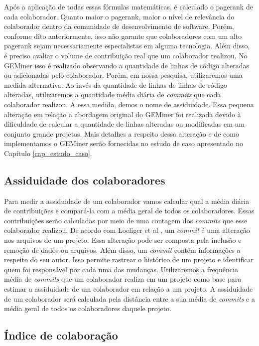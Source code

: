 Após a aplicação de todas essas fórmulas matemáticas, é calculado o pagerank de cada colaborador. Quanto maior o pagerank, maior o nível de relevância do colaborador dentro da comunidade de desenvolvimento de software. Porém, conforme dito anteriormente, isso não garante que colaboradores com um alto pagerank sejam necessariamente especialistas em alguma tecnologia. Além disso, é preciso avaliar o volume de contribuição real que um colaborador realizou. No GEMiner isso é realizado observando a quantidade de linhas de código alteradas ou adicionadas pelo colaborador. Porém, em nossa pesquisa, utilizaremos uma medida alternativa. Ao invés da quantidade de linhas de linhas de código alteradas, utilizaremos a quantidade média diária de \textit{commits} que cada colaborador realizou. A essa medida, demos o nome de assiduidade. Essa pequena alteração em relação a abordagem original do GEMiner foi realizada devido à dificuldade de calcular a quantidade de linhas alteradas ou modificadas em um conjunto grande projetos. Mais detalhes a respeito dessa alteração e de como implementamos o GEMiner serão fornecidas no estudo de caso apresentado no Capítulo \ref{cap_estudo_caso}.

\subsection{Assiduidade dos colaboradores}

Para medir a assiduidade de um colaborador vamos calcular qual a média diária de contribuições e compará-la com a média geral de todos os colaboradores. Essas contribuições serão calculadas por meio de uma contagem dos \textit{commits} que esse colaborador realizou.  De acordo com Loeliger et al \cite{loeliger2012version}, um \textit{commit} é uma alteração nos arquivos de um projeto. Essa alteração pode ser composta pela inclusão e remoção de dados ou arquivos. Além disso, um \textit{commit} contém informações a respeito do seu autor. Isso permite rastrear o histórico de um projeto e identificar quem foi responsável por cada uma das mudanças.  Utilizaremos a frequência média de \textit{commits} que um colaborador realiza em um projeto como base para estimar a assiduidade de um colaborador em relação a um projeto. A assiduidade de um colaborador será calculada pela distância entre a sua média de \textit{commits} e a média geral de todos os colaboradores daquele projeto.



\subsection{Índice de colaboração}

